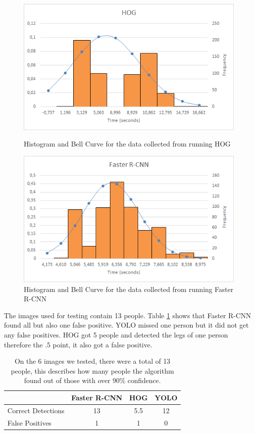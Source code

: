 \begin{figure}[!hbt]
\centering
\begin{minipage}{.47\textwidth}
\includegraphics[width=\textwidth]{src/imgs/HOG_graph.png}
\caption[HOG Histogram]{Histogram and Bell Curve for the data collected from running HOG}
\label{fig:hog}
\end{minipage}\hspace*{.06\textwidth}%
\begin{minipage}{.47\textwidth}
\centering
\includegraphics[width=\textwidth]{src/imgs/FasterRCNN_graph.png}
\caption[Faster R-CNN Histogram]{Histogram and Bell Curve for the data collected from running Faster R-CNN}
\label{fig:rcnn}
\end{minipage}
\end{figure}

\noindent The images used for testing contain 13 people. Table \ref{tab:precision} shows that Faster R-CNN found all but also one false positive. YOLO missed one person but it did not get any false positives. HOG got 5 people and detected the legs of one person therefore the .5 point, it also got a false positive.

\begin{table}[!hbt]
\centering
\begin{tabular}{|l|c|c|c|}\hline
&Faster R-CNN&HOG&YOLO\\\hline
Correct Detections&13&5.5&12\\\hline
False Positives&1&1&0\\\hline
\end{tabular}
\caption[Precision Table]{On the 6 images we tested, there were a total of 13 people, this describes how many people the algorithm found out of those with over 90\% confidence.}
\label{tab:precision}
\end{table}
